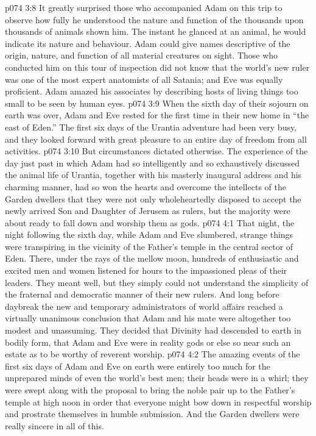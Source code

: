 \vs p074 3:8 It greatly surprised those who accompanied Adam on this trip to observe how fully he understood the nature and function of the thousands upon thousands of animals shown him. The instant he glanced at an animal, he would indicate its nature and behaviour. Adam could give names descriptive of the origin, nature, and function of all material creatures on sight. Those who conducted him on this tour of inspection did not know that the world’s new ruler was one of the most expert anatomists of all Satania; and Eve was equally proficient. Adam amazed his associates by describing hosts of living things too small to be seen by human eyes.
\vs p074 3:9 When the sixth day of their sojourn on earth was over, Adam and Eve rested for the first time in their new home in “the east of Eden.” The first six days of the Urantia adventure had been very busy, and they looked forward with great pleasure to an entire day of freedom from all activities.
\vs p074 3:10 But circumstances dictated otherwise. The experience of the day just past in which Adam had so intelligently and so exhaustively discussed the animal life of Urantia, together with his masterly inaugural address and his charming manner, had so won the hearts and overcome the intellects of the Garden dwellers that they were not only wholeheartedly disposed to accept the newly arrived Son and Daughter of Jerusem as rulers, but the majority were about ready to fall down and worship them as gods.
\vs p074 4:1 That night, the night following the sixth day, while Adam and Eve slumbered, strange things were transpiring in the vicinity of the Father’s temple in the central sector of Eden. There, under the rays of the mellow moon, hundreds of enthusiastic and excited men and women listened for hours to the impassioned pleas of their leaders. They meant well, but they simply could not understand the simplicity of the fraternal and democratic manner of their new rulers. And long before daybreak the new and temporary administrators of world affairs reached a virtually unanimous conclusion that Adam and his mate were altogether too modest and unassuming. They decided that Divinity had descended to earth in bodily form, that Adam and Eve were in reality gods or else so near such an estate as to be worthy of reverent worship.
\vs p074 4:2 The amazing events of the first six days of Adam and Eve on earth were entirely too much for the unprepared minds of even the world’s best men; their heads were in a whirl; they were swept along with the proposal to bring the noble pair up to the Father’s temple at high noon in order that everyone might bow down in respectful worship and prostrate themselves in humble submission. And the Garden dwellers were really sincere in all of this.
